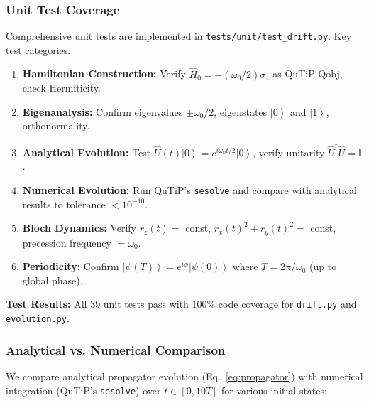 \documentclass[11pt,a4paper]{article}
\theoremstyle{definition}
\theoremstyle{remark}
\newcommand{\ket}[1]{\left|#1\right\rangle}
\newcommand{\identity}{\mathbb{I}}
\begin{document}
\subsubsection{Unit Test Coverage}

Comprehensive unit tests are implemented in \texttt{tests/unit/test\_drift.py}. Key test categories:

\begin{enumerate}[label=\textbf{Test \arabic*:}]
    \item \textbf{Hamiltonian Construction:} Verify $\hat{H}_0 = -(\omega_0/2) \sigma_z$ as QuTiP Qobj, check Hermiticity.
    \item \textbf{Eigenanalysis:} Confirm eigenvalues $\pm \omega_0/2$, eigenstates $\ket{0}$ and $\ket{1}$, orthonormality.
    \item \textbf{Analytical Evolution:} Test $\hat{U}(t) \ket{0} = e^{i\omega_0 t/2} \ket{0}$, verify unitarity $\hat{U}^\dagger \hat{U} = \identity$.
    \item \textbf{Numerical Evolution:} Run QuTiP's \texttt{sesolve} and compare with analytical results to tolerance $< 10^{-10}$.
    \item \textbf{Bloch Dynamics:} Verify $r_z(t) = $ const, $r_x(t)^2 + r_y(t)^2 = $ const, precession frequency $= \omega_0$.
    \item \textbf{Periodicity:} Confirm $\ket{\psi(T)} = e^{i\phi} \ket{\psi(0)}$ where $T = 2\pi/\omega_0$ (up to global phase).
\end{enumerate}

\textbf{Test Results:} All 39 unit tests pass with 100\% code coverage for \texttt{drift.py} and \texttt{evolution.py}.

\subsubsection{Analytical vs. Numerical Comparison}

We compare analytical propagator evolution (Eq.~\ref{eq:propagator}) with numerical integration (QuTiP's \texttt{sesolve}) over $t \in [0, 10T]$ for various initial states:
\end{document}
